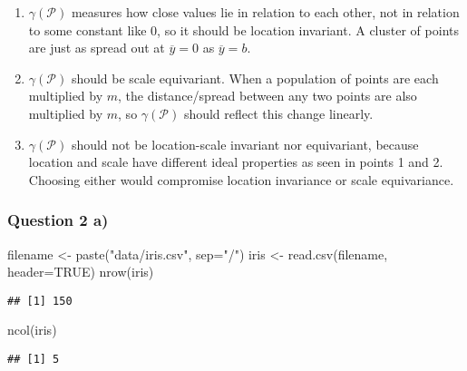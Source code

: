 \documentclass[
]{article}
\newenvironment{Shaded}{\begin{snugshade}}{\end{snugshade}}
\newcommand{\AttributeTok}[1]{\textcolor[rgb]{0.77,0.63,0.00}{#1}}
\newcommand{\ConstantTok}[1]{\textcolor[rgb]{0.00,0.00,0.00}{#1}}
\newcommand{\FunctionTok}[1]{\textcolor[rgb]{0.00,0.00,0.00}{#1}}
\newcommand{\NormalTok}[1]{#1}
\newcommand{\OtherTok}[1]{\textcolor[rgb]{0.56,0.35,0.01}{#1}}
\newcommand{\StringTok}[1]{\textcolor[rgb]{0.31,0.60,0.02}{#1}}
\begin{document}
\begin{enumerate}
\def\labelenumi{\arabic{enumi}.}
\item
  \(\gamma(\mathcal P)\) measures how close values lie in relation to
  each other, not in relation to some constant like 0, so it should be
  location invariant. A cluster of points are just as spread out at
  \(\overline{y}=0\) as \(\overline{y}=b\).
\item
  \(\gamma(\mathcal P)\) should be scale equivariant. When a population
  of points are each multiplied by \(m\), the distance/spread between
  any two points are also multiplied by \(m\), so \(\gamma(\mathcal P)\)
  should reflect this change linearly.
\item
  \(\gamma(\mathcal P)\) should not be location-scale invariant nor
  equivariant, because location and scale have different ideal
  properties as seen in points 1 and 2. Choosing either would compromise
  location invariance or scale equivariance.
\end{enumerate}

\newpage

\hypertarget{question-2-a}{%
\subsubsection{Question 2 a)}\label{question-2-a}}

\begin{Shaded}
\begin{Highlighting}[]
\NormalTok{filename }\OtherTok{\textless{}{-}} \FunctionTok{paste}\NormalTok{(}\StringTok{"data/iris.csv"}\NormalTok{, }\AttributeTok{sep=}\StringTok{"/"}\NormalTok{)}
\NormalTok{iris }\OtherTok{\textless{}{-}} \FunctionTok{read.csv}\NormalTok{(filename, }\AttributeTok{header=}\ConstantTok{TRUE}\NormalTok{)}
\FunctionTok{nrow}\NormalTok{(iris)}
\end{Highlighting}
\end{Shaded}

\begin{verbatim}
## [1] 150
\end{verbatim}

\begin{Shaded}
\begin{Highlighting}[]
\FunctionTok{ncol}\NormalTok{(iris)}
\end{Highlighting}
\end{Shaded}

\begin{verbatim}
## [1] 5
\end{verbatim}
\end{document}
